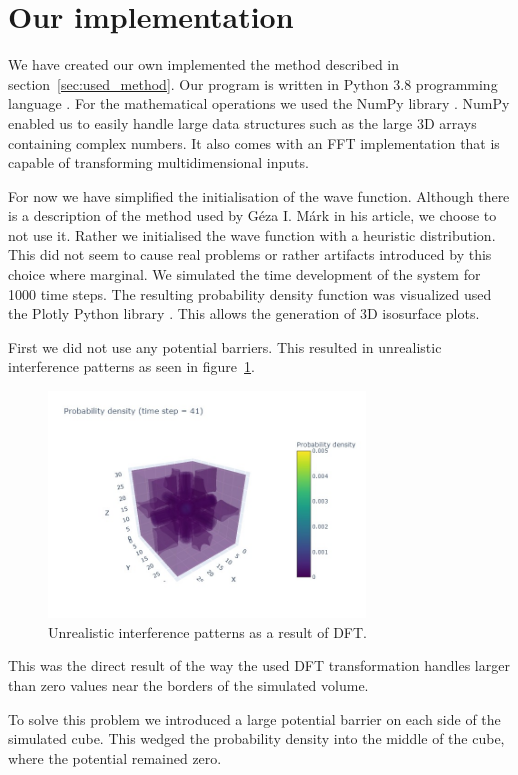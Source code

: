 \section{Our implementation}
\label{sec:our_implementation}

We have created our own implemented the method described in section~\ref{sec:used_method}.
Our program is written in Python 3.8 programming language \cite{Python}.
For the mathematical operations we used the NumPy library \cite{NumPy}.
NumPy enabled us to easily handle large data structures such as the large 3D arrays containing complex numbers.
It also comes with an FFT implementation that is capable of transforming multidimensional inputs.

For now we have simplified the initialisation of the wave function.
Although there is a description of the method used by Géza I. Márk in his article, we choose to not use it.
Rather we initialised the wave function with a heuristic distribution.
This did not seem to cause real problems or rather artifacts introduced by this choice where marginal.
We simulated the time development of the system for 1000 time steps.
The resulting probability density function was visualized used the Plotly Python library \cite{Plotly}.
This allows the generation of 3D isosurface plots.

First we did not use any potential barriers.
This resulted in unrealistic interference patterns as seen in figure~\ref{fig:interference}.
\begin{figure}
	\includegraphics[width=0.75\textwidth]{"figures/interference_01.jpeg"}
	\caption{Unrealistic interference patterns as a result of DFT.}
	\label{fig:interference}
\end{figure}
This was the direct result of the way the used DFT transformation handles larger than zero values near the borders of the simulated volume.

To solve this problem we introduced a large potential barrier on each side of the simulated cube.
This wedged the probability density into the middle of the cube, where the potential remained zero.

